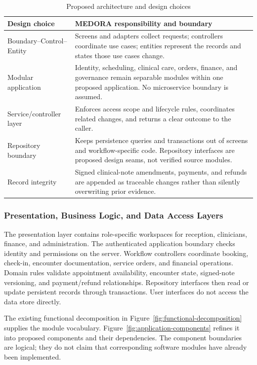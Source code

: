 \documentclass[a4paper,12pt]{article}
\begin{document}
\begin{table}[H]
\centering
\small
\renewcommand{\arraystretch}{1.12}
\begin{tabularx}{\textwidth}{@{}P{0.23\textwidth}Y@{}}
\toprule
Design choice & MEDORA responsibility and boundary \\
\midrule
Boundary--Control--Entity & Screens and adapters collect requests; controllers coordinate use cases; entities represent the records and states those use cases change. \\
Modular application & Identity, scheduling, clinical care, orders, finance, and governance remain separable modules within one proposed application. No microservice boundary is assumed. \\
Service/controller layer & Enforces access scope and lifecycle rules, coordinates related changes, and returns a clear outcome to the caller. \\
Repository boundary & Keeps persistence queries and transactions out of screens and workflow-specific code. Repository interfaces are proposed design seams, not verified source modules. \\
Record integrity & Signed clinical-note amendments, payments, and refunds are appended as traceable changes rather than silently overwriting prior evidence. \\
\bottomrule
\end{tabularx}
\caption{Proposed architecture and design choices}
\label{tab:system-design-choices}
\end{table}

\subsubsection{Presentation, Business Logic, and Data Access Layers}

The presentation layer contains role-specific workspaces for reception, clinicians, finance, and administration. The authenticated application boundary checks identity and permissions on the server. Workflow controllers coordinate booking, check-in, encounter documentation, service orders, and financial operations. Domain rules validate appointment availability, encounter state, signed-note versioning, and payment/refund relationships. Repository interfaces then read or update persistent records through transactions. User interfaces do not access the data store directly.

The existing functional decomposition in Figure~\ref{fig:functional-decomposition} supplies the module vocabulary. Figure~\ref{fig:application-components} refines it into proposed components and their dependencies. The component boundaries are logical; they do not claim that corresponding software modules have already been implemented.
\end{document}

